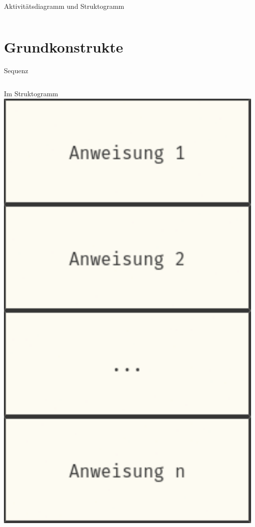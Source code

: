 \documentclass[xelatex,aspectratio=169]{beamer}
\begin{document}
\begin{frame}{Aktivitätsdiagramm und Struktogramm}
\begin{columns}
\begin{column}{.3\linewidth}
    \end{column}
  \end{columns}
\end{frame}

\section{Grundkonstrukte}

\begin{frame}{Sequenz}

  \begin{columns}[t]
    \begin{column}{.3\linewidth}
      \begin{block}{Im Struktogramm}
        \centering
        \includegraphics[height=.7\textheight]{fig/algorithmus_sequenz_struktogram.pdf}

\end{block}
\end{column}
\end{columns}
\end{frame}
\end{document}
